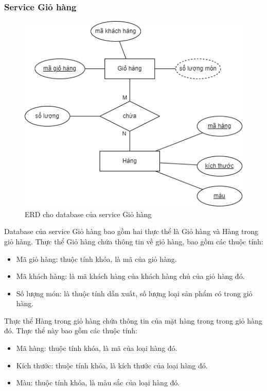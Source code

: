 \subsubsection{Service Giỏ hàng}
\begin{figure}[!htp]
    \begin{center}
        \includegraphics[width=1\textwidth]{img/database/erd/eerd-cart.png}
        \newline
        \caption{ERD cho database của service Giỏ hàng}
    \end{center}
\end{figure}

\par Database của service Giỏ hàng bao gồm hai thực thể là Giỏ hàng và Hàng trong giỏ hàng. Thực thể Giỏ hàng chứa thông tin về giỏ hàng, bao gồm các thuộc tính:
\begin{itemize}
    \item Mã giỏ hàng: thuộc tính khóa, là mã của giỏ hàng.
    \item Mã khách hàng: là mã khách hàng của khách hàng chủ của giỏ hàng đó.
    \item Số lượng món: là thuộc tính dẫn xuất, số lượng loại sản phẩm có trong giỏ hàng.
\end{itemize}

\par Thực thể Hàng trong giỏ hàng chứa thông tin của mặt hàng trong trong giỏ hàng đó. Thực thể này bao gồm các thuộc tính:
\begin{itemize}
    \item Mã hàng: thuộc tính khóa, là mã của loại hàng đó.
    \item Kích thước: thuộc tính khóa, là kích thước của loại hàng đó.
    \item Màu: thuộc tính khóa, là màu sắc của loại hàng đó.
\end{itemize}

